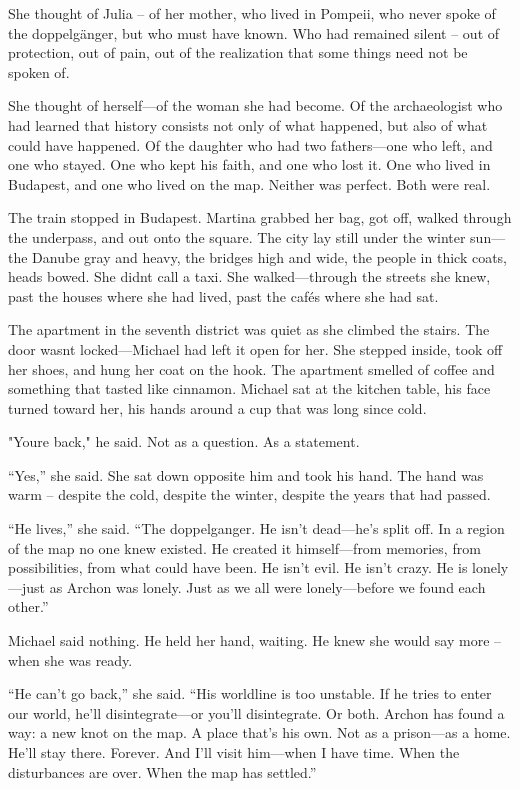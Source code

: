 \documentclass[
]{article}
\begin{document}
She thought of Julia -- of her mother, who lived in Pompeii, who never spoke of the doppelgänger, but who must have known. Who had remained silent -- \hspace{0pt}\hspace{0pt}out of protection, out of pain, out of the realization that some things need not be spoken of.

She thought of herself---of the woman she had become. Of the archaeologist who had learned that history consists not only of what happened, but also of what could have happened. Of the daughter who had two fathers---one who left, and one who stayed. One who kept his faith, and one who lost it. One who lived in Budapest, and one who lived on the map. Neither was perfect. Both were real.

The train stopped in Budapest. Martina grabbed her bag, got off, walked through the underpass, and out onto the square. The city lay still under the winter sun---the Danube gray and heavy, the bridges high and wide, the people in thick coats, heads bowed. She didn\textquotesingle t call a taxi. She walked---through the streets she knew, past the houses where she had lived, past the cafés where she had sat.

The apartment in the seventh district was quiet as she climbed the stairs. The door wasn\textquotesingle t locked---Michael had left it open for her. She stepped inside, took off her shoes, and hung her coat on the hook. The apartment smelled of coffee and something that tasted like cinnamon. Michael sat at the kitchen table, his face turned toward her, his hands around a cup that was long since cold.

"You\textquotesingle re back," he said. Not as a question. As a statement.

``Yes,'' she said. She sat down opposite him and took his hand. The hand was warm -- despite the cold, despite the winter, despite the years that had passed.

``He lives,'' she said. ``The doppelganger. He isn't dead---he's split off. In a region of the map no one knew existed. He created it himself---from memories, from possibilities, from what could have been. He isn't evil. He isn't crazy. He is lonely---just as Archon was lonely. Just as we all were lonely---before we found each other.''

Michael said nothing. He held her hand, waiting. He knew she would say more -- when she was ready.

``He can't go back,'' she said. ``His worldline is too unstable. If he tries to enter our world, he'll disintegrate---or you'll disintegrate. Or both. Archon has found a way: a new knot on the map. A place that's his own. Not as a prison---as a home. He'll stay there. Forever. And I'll visit him---when I have time. When the disturbances are over. When the map has settled.''
\end{document}

